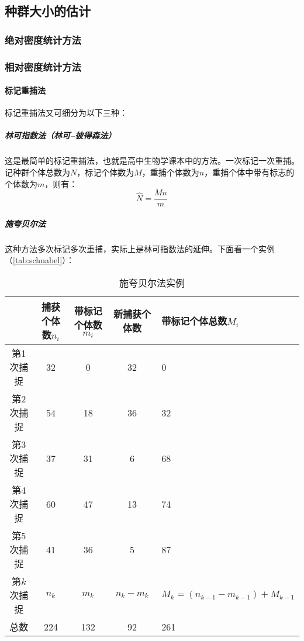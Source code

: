 \subsection{种群大小的估计}

\subsubsection{绝对密度统计方法}

\subsubsection{相对密度统计方法}

\paragraph{标记重捕法}

标记重捕法又可细分为以下三种：
\subparagraph{林可指数法（林可--彼得森法）}

这是最简单的标记重捕法，也就是高中生物学课本中的方法。一次标记一次重捕。记种群个体总数为$N$，标记个体数为$M$，重捕个体数为$n$，重捕个体中带有标志的个体数为$m$，则有：\[\hat{N}=\frac{Mn}{m}\]

 

\subparagraph{施夸贝尔法}

这种方法多次标记多次重捕，实际上是林可指数法的延伸。下面看一个实例（\autoref{tab:schnabel}）：

\begin{table}[htbp]
	\centering
	\begin{tabularx}{\textwidth}{|c|c|c|c|X|}
		\hline
		& 捕获个体数$n_{i}$ & 带标记个体数$m_{i}$ & 新捕获个体数 & 带标记个体总数$M_{i}$ \\ \hline
		第1次捕捉 & 32    & 0      & 32     & 0       \\ \hline
		第2次捕捉 & 54    & 18     & 36     & 32      \\ \hline
		第3次捕捉 & 37    & 31     & 6      & 68      \\ \hline
		第4次捕捉 & 60    & 47     & 13     & 74      \\ \hline
		第5次捕捉 & 41    & 36     & 5      & 87      \\ \hline
		第$k$次捕捉 & $n_{k}$    & $m_{k}$     & $n_{k}-m_{k}$      & $M_{k}=(n_{k-1}-m_{k-1})+M_{k-1}$      \\ \hline
		总数    & 224   & 132    & 92     & 261     \\ \hline
	\end{tabularx}
	\caption{施夸贝尔法实例}
	\label{tab:schnabel}
\end{table}

